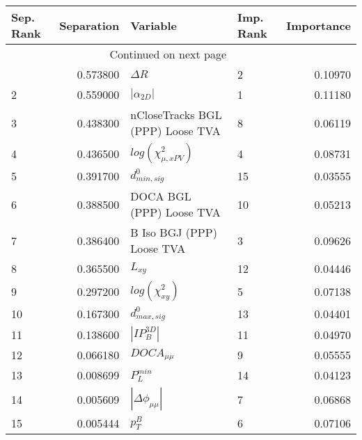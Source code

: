 \usepackage{lscape}

\begin{landscape}
\begin{longtable}{lrllr}
\toprule
Sep. Rank &  Separation &                          Variable & Imp. Rank &  Importance \\
\midrule
\endhead
\midrule
\multicolumn{3}{r}{{Continued on next page}} \\
\midrule
\endfoot

\bottomrule
\endlastfoot
        1 &    0.573800 &                        $\Delta R$ &         2 &     0.10970 \\
        2 &    0.559000 &                   $|\alpha_{2D}|$ &         1 &     0.11180 \\
        3 &    0.438300 &  nCloseTracks BGL (PPP) Loose TVA &         8 &     0.06119 \\
        4 &    0.436500 &         $log(\chi^{2}_{\mu,xPV})$ &         4 &     0.08731 \\
        5 &    0.391700 &                  $d^0_{min, sig}$ &        15 &     0.03555 \\
        6 &    0.388500 &          DOCA BGL (PPP) Loose TVA &        10 &     0.05213 \\
        7 &    0.386400 &         B Iso BGJ (PPP) Loose TVA &         3 &     0.09626 \\
        8 &    0.365500 &                          $L_{xy}$ &        12 &     0.04446 \\
        9 &    0.297200 &              $log(\chi^{2}_{xy})$ &         5 &     0.07138 \\
       10 &    0.167300 &                  $d^0_{max, sig}$ &        13 &     0.04401 \\
       11 &    0.138600 &                   $|IP_{B}^{3D}|$ &        11 &     0.04970 \\
       12 &    0.066180 &                   $DOCA_{\mu\mu}$ &         9 &     0.05555 \\
       13 &    0.008699 &                     $P^{min}_{L}$ &        14 &     0.04123 \\
       14 &    0.005609 &          $|\Delta \phi_{\mu\mu}|$ &         7 &     0.06868 \\
       15 &    0.005444 &                         $p^B_{T}$ &         6 &     0.07106 \\
\end{longtable}

\end{landscape}
